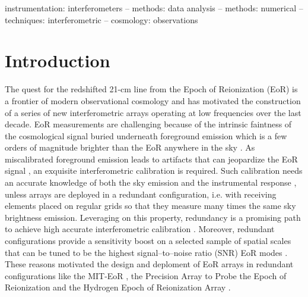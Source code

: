 \documentclass[useAMS,usenatbib]{mn2e}
\begin{document}
\begin{abstract}
\end{abstract}


\begin{keywords}
instrumentation: interferometers -- methods: data analysis -- methods: numerical --techniques: interferometric -- cosmology: observations
\end{keywords}

\section{Introduction}
The quest for the redshifted 21-cm line from the Epoch of Reionization (EoR) is a frontier of modern observational cosmology and has motivated the construction of a series of new interferometric arrays operating at low frequencies over the last decade. EoR measurements are challenging because of the intrinsic faintness of the cosmological signal \citep[see, for instance,][for recent reviews]{Furlanetto2016,McQuinn2016} buried underneath foreground emission which is a few orders of magnitude brighter than the EoR anywhere in the sky \citep[e.g.,][]{Bernardi2009,Bernardi2010,Ghosh2012,Dillon2014,Parsons2014}. 
As miscalibrated foreground emission leads to artifacts that can jeopardize the EoR signal \citep[e.g.,][]{grobler2014,barry2016,ewall-wice2016}, an exquisite interferometric calibration is required. Such calibration needs an accurate knowledge of both the sky emission and the instrumental response \citep[e.g.,][]{Smirnov2011c}, unless arrays are deployed in a redundant configuration, i.e. with receiving elements placed on regular grids so that they measure many times the same sky brightness emission. Leveraging on this property, redundancy is a promising path to achieve high accurate interferometric calibration \citep[][]{Noordam1982,Wieringa1992,Pearson1984,Liu2010,Noorishad2012,Marthi2014,Sievers2017}. Moreover, redundant configurations provide a sensitivity boost on a selected sample of spatial scales that can be tuned to be the highest signal--to--noise ratio (SNR) EoR modes \citep[][]{Parsons2012,Dillon2016}. These reasons motivated the design and deploment of EoR arrays in redundant configurations like the MIT-EoR \citep{Zheng2014}, the Precision Array to Probe the Epoch of Reionization \citep[PAPER,][]{Ali2015} and the Hydrogen Epoch of Reionization Array \citep[HERA,][]{deboer2017}. 
\end{document}
